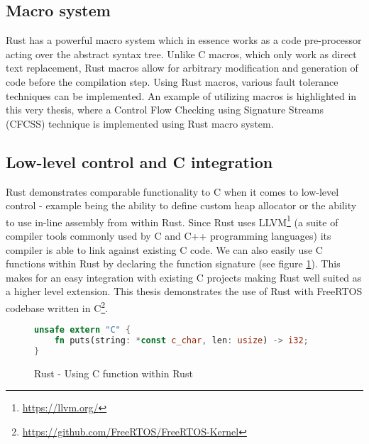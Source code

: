 \subsection{Macro system}
Rust has a powerful macro system which in essence works as a code pre-processor acting over the abstract syntax tree. Unlike C macros, which only work as direct text replacement, Rust macros allow for arbitrary modification and generation of code before the compilation step. Using Rust macros, various fault tolerance techniques can be implemented. An example of utilizing macros is highlighted in this very thesis, where a Control Flow Checking using Signature Streams (CFCSS) technique is implemented using Rust macro system. 

\subsection{Low-level control and C integration}
Rust demonstrates comparable functionality to C when it comes to low-level control - example being the ability to define custom heap allocator or the ability to use in-line assembly from within Rust. Since Rust uses LLVM\footnote{\url{https://llvm.org/}} (a suite of compiler tools commonly used by C and C++ programming languages) its compiler is able to link against existing C code. We can also easily use C functions within Rust by declaring the function signature (see figure \ref{fig:rust_extern}). This makes for an easy integration with existing C projects making Rust well suited as a higher level extension. This thesis demonstrates the use of Rust with FreeRTOS codebase written in C\footnote{\url{https://github.com/FreeRTOS/FreeRTOS-Kernel}}.

\begin{figure}[!h]
\begin{lstlisting}[language=Rust]
unsafe extern "C" {
    fn puts(string: *const c_char, len: usize) -> i32;
}
\end{lstlisting}
\caption{Rust - Using C function within Rust}
\label{fig:rust_extern}
\end{figure}
